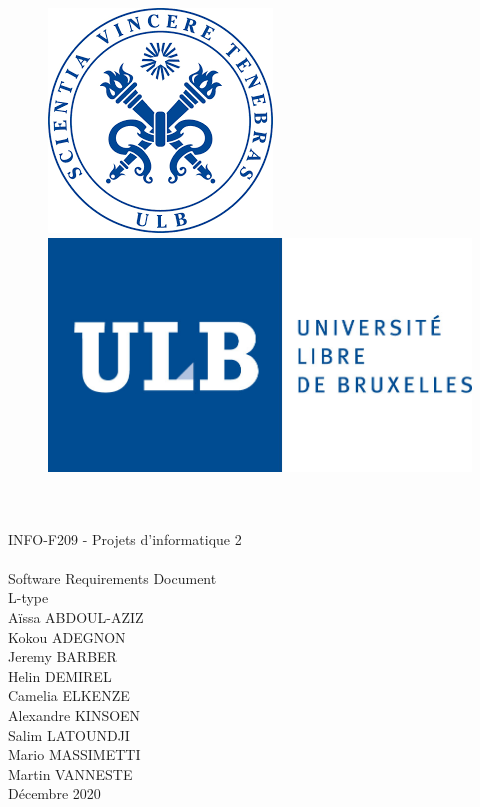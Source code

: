 \documentclass[a4paper,12pt]{article}
\begin{document}
    \begin{titlepage}

        \begin{center}
        
            \begin{figure}[H]
              \begin{minipage}[c]{.46\linewidth}
                    \centering
                    \includegraphics[scale = 0.3]{images/ulb.png}
                \end{minipage}
                \hfill%
                \begin{minipage}[c]{.46\linewidth}
                    \centering
                    \includegraphics[scale=0.5]{images/ulb2.jpg}
                \end{minipage}
            \end{figure}
        
            {\\[2 cm] \Huge\\INFO-F209 - Projets d'informatique 2 \\ \\ Software Requirements Document \\ [1 cm]
            L-type\\[2 cm]}
            {Aïssa ABDOUL-AZIZ \\[0,2 cm] Kokou ADEGNON \\[0,2 cm] Jeremy BARBER \\[0,2 cm] Helin DEMIREL \\[0,2 cm] Camelia ELKENZE \\[0,2 cm] Alexandre KINSOEN \\[0,2 cm] Salim LATOUNDJI \\[0,2 cm] Mario MASSIMETTI \\[0,2 cm] Martin VANNESTE \\ [3 cm] Décembre 2020}


\end{center}
\end{titlepage}
\end{document}

